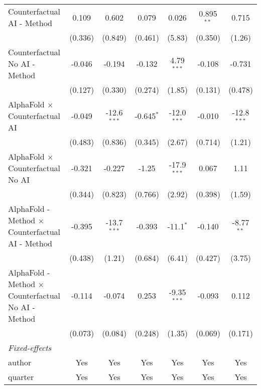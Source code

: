 \begin{tabular}{lcccccc}
   Counterfactual AI - Method                                 & 0.109   & 0.602         & 0.079        & 0.026         & 0.895$^{**}$ & 0.715\\   
                                                              & (0.336) & (0.849)       & (0.461)      & (5.83)        & (0.350)      & (1.26)\\   
   Counterfactual No AI - Method                              & -0.046  & -0.194        & -0.132       & 4.79$^{***}$  & -0.108       & -0.731\\   
                                                              & (0.127) & (0.330)       & (0.274)      & (1.85)        & (0.131)      & (0.478)\\   
   AlphaFold $\times$ Counterfactual AI                       & -0.049  & -12.6$^{***}$ & -0.645$^{*}$ & -12.0$^{***}$ & -0.010       & -12.8$^{***}$\\   
                                                              & (0.483) & (0.836)       & (0.345)      & (2.67)        & (0.714)      & (1.21)\\   
   AlphaFold $\times$ Counterfactual No AI                    & -0.321  & -0.227        & -1.25        & -17.9$^{***}$ & 0.067        & 1.11\\   
                                                              & (0.344) & (0.823)       & (0.766)      & (2.92)        & (0.398)      & (1.59)\\   
   AlphaFold - Method $\times$ Counterfactual AI - Method     & -0.395  & -13.7$^{***}$ & -0.393       & -11.1$^{*}$   & -0.140       & -8.77$^{**}$\\   
                                                              & (0.438) & (1.21)        & (0.684)      & (6.41)        & (0.427)      & (3.75)\\   
   AlphaFold - Method $\times$ Counterfactual No AI - Method  & -0.114  & -0.074        & 0.253        & -9.35$^{***}$ & -0.093       & 0.112\\   
                                                              & (0.073) & (0.084)       & (0.248)      & (1.35)        & (0.069)      & (0.171)\\   
   \midrule
   \emph{Fixed-effects}\\
   author                                                     & Yes     & Yes           & Yes          & Yes           & Yes          & Yes\\  
   quarter                                                    & Yes     & Yes           & Yes          & Yes           & Yes          & Yes\\  

\end{tabular}
